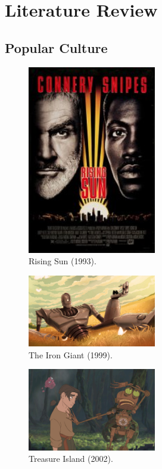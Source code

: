 \chapter{Literature Review}

\section{Popular Culture}

\begin{figure}[H]
\centering
\includegraphics[width=0.5\textwidth]{images/literature/rising-sun.jpg} 
\caption{Rising Sun (1993).}
\label{fig:rising-sun}
\end{figure}

\begin{figure}[H]
\centering
\includegraphics[width=0.5\textwidth]{images/literature/the-iron-giant-1999.jpg} 
\caption{The Iron Giant (1999).}
\label{fig:the-iron-giant-1999}
\end{figure}

\begin{figure}[H]
\centering
\includegraphics[width=0.5\textwidth]{images/literature/BEN-treasure-island-2002.jpg} 
\caption{Treasure Island (2002).}
\label{fig:BEN-treasure-island-2002}
\end{figure}

